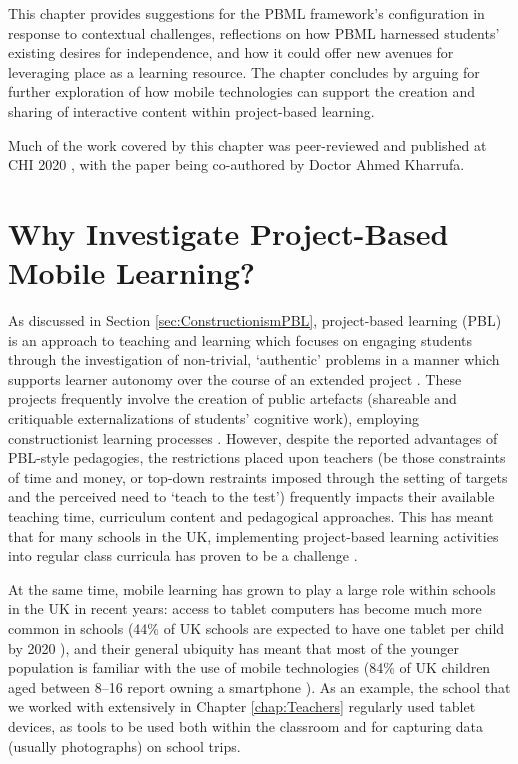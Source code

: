 This chapter provides suggestions for the PBML framework's configuration in response to contextual challenges, reflections on how PBML harnessed students' existing desires for independence, and how it could offer new avenues for leveraging place as a learning resource. The chapter concludes by arguing for further exploration of how mobile technologies can support the creation and sharing of interactive content within project-based learning.

Much  of the work covered by this chapter was peer-reviewed and published at CHI 2020 \citep{Richardson2020}, with the paper being co-authored by Doctor Ahmed Kharrufa.

\section{Why Investigate Project-Based Mobile Learning?}
As discussed in Section \ref{sec:ConstructionismPBL}, project-based learning (PBL) is an approach to teaching and learning which focuses on engaging students through the investigation of non-trivial, `authentic' problems in a manner which supports learner autonomy over the course of an extended project \citep{Blumenfeld1991}. These projects frequently involve the creation of public artefacts (shareable and critiquable externalizations of students' cognitive work), employing constructionist learning processes \citep{Papert1991, Holubova2008}. However, despite the reported advantages of PBL-style pedagogies, the restrictions placed upon teachers (be those constraints of time and money, or top-down restraints imposed through the setting of targets and the perceived need to `teach to the test') frequently impacts their available teaching time, curriculum content and pedagogical approaches. This has meant that for many schools in the UK, implementing project-based learning activities into regular class curricula has proven to be a challenge \citep{TheEducationEndowmentFoundation2016}.

At the same time, mobile learning has grown to play a large role within schools in the UK in recent years: access to tablet computers has become much more common in schools (44\% of UK schools are expected to have one tablet per child by 2020 \citep{BritishEducationalSuppliersAssociation2015}), and their general ubiquity has meant that most of the younger population is familiar with the use of mobile technologies (84\% of UK children aged between 8--16 report owning a smartphone \citep{Statistica2018a}). As an example, the school that we worked with extensively in Chapter \ref{chap:Teachers} regularly used tablet devices, as tools to be used both within the classroom and for capturing data (usually photographs) on school trips.

